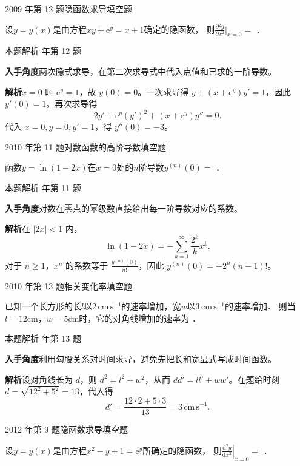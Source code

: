 \documentclass[UTF8,zihao=-4,fontset=fandol]{ctexart}
\newcommand{\blank}{\underline{\hspace{5em}}}
\newcommand{\QuestionPage}[6]{%
  \par\noindent\begin{minipage}{\linewidth}
  \raggedright
  {\small\textcolor{black!60}{#3\quad #5}\hfill\textcolor{accent}{#2}}\par\smallskip}
\newcommand{\QuestionEnd}{\end{minipage}\par\medskip}
\newcommand{\QuestionPage}[6]{%
  \clearpage
  {\small\textcolor{accent}{#1\hfill #2}}\par\medskip
  {\small\textcolor{black!60}{#3\quad #5\hfill #6}}\par\vspace{9bp}}
\newcommand{\QuestionEnd}{}
\newenvironment{QuestionSolution}[1]{%
  \clearpage
  {\small\textcolor{black!60}{本题解析\quad #1}}\par\medskip
}{\par\clearpage}
\begin{document}
\QuestionPage{2.2 求导的基本法则}{填空题}{2009 年第 12 题}{2}{隐函数求导}{062 / 234}
设$y = y(x)$是由方程$xy + \mathrm{e}^y = x + 1$确定的隐函数，
则$\frac{\partial{}^2 y}{\partial{} x^2}\Big|_{x = 0} =$ \blank{}．
\QuestionEnd

\begin{QuestionSolution}{2009 年第 12 题}
\textbf{入手角度}\quad 两次隐式求导，在第二次求导式中代入点值和已求的一阶导数。

\textbf{解析}\quad \(x=0\) 时 \(\mathrm{e}^y=1\)，故 \(y(0)=0\)。一次求导得 \(y+(x+\mathrm{e}^y)y'=1\)，因此 \(y'(0)=1\)。再次求导得
\[
2y'+\mathrm{e}^y(y')^2+(x+\mathrm{e}^y)y''=0.
\]
代入 \(x=0,y=0,y'=1\)，得 \(\boxed{y''(0)=-3}\)。
\end{QuestionSolution}

\QuestionPage{2.2 求导的基本法则}{填空题}{2010 年第 11 题}{2}{对数函数的高阶导数}{063 / 234}
函数$y = \ln(1 - 2x)$在$x = 0$处的$n$阶导数$y^{(n)}(0) =$ \blank{}．
\QuestionEnd

\begin{QuestionSolution}{2010 年第 11 题}
\textbf{入手角度}\quad 对数在零点的幂级数直接给出每一阶导数对应的系数。

\textbf{解析}\quad 在 \(|2x|<1\) 内，
\[
\ln(1-2x)=-\sum_{k=1}^{\infty}\frac{2^k}{k}x^k.
\]
对于 \(n\ge1\)，\(x^n\) 的系数等于 \(\frac{y^{(n)}(0)}{n!}\)，因此 \(\boxed{y^{(n)}(0)=-2^n(n-1)!}\)。
\end{QuestionSolution}

\QuestionPage{2.2 求导的基本法则}{填空题}{2010 年第 13 题}{2}{相关变化率}{064 / 234}
已知一个长方形的长$l$以$2\,\mathrm{cm}\,\mathrm{s}^{-1}$的速率增加，宽$w$以$3\,\mathrm{cm}\,\mathrm{s}^{-1}$的速率增加．
则当$l = 12\text{cm}$，$w = 5\text{cm}$时，它的对角线增加的速率为 \blank{}．
\QuestionEnd

\begin{QuestionSolution}{2010 年第 13 题}
\textbf{入手角度}\quad 利用勾股关系对时间求导，避免先把长和宽显式写成时间函数。

\textbf{解析}\quad 设对角线长为 \(d\)，则 \(d^2=l^2+w^2\)，从而 \(dd'=ll'+ww'\)。在题给时刻 \(d=\sqrt{12^2+5^2}=13\)，代入得
\[
d'=\frac{12\cdot2+5\cdot3}{13}=\boxed{3\,\mathrm{cm}\,\mathrm{s}^{-1}}.
\]
\end{QuestionSolution}

\QuestionPage{2.2 求导的基本法则}{填空题}{2012 年第 9 题}{2}{隐函数求导}{065 / 234}
设$y = y(x)$是由方程$x^2 - y + 1 = \mathrm{e}^y$所确定的隐函数，
则$\left. \frac{\mathrm{d}^2y}{\mathrm{d} x^2} \right|_{x = 0} =$ \blank{}．
\QuestionEnd
\end{document}
